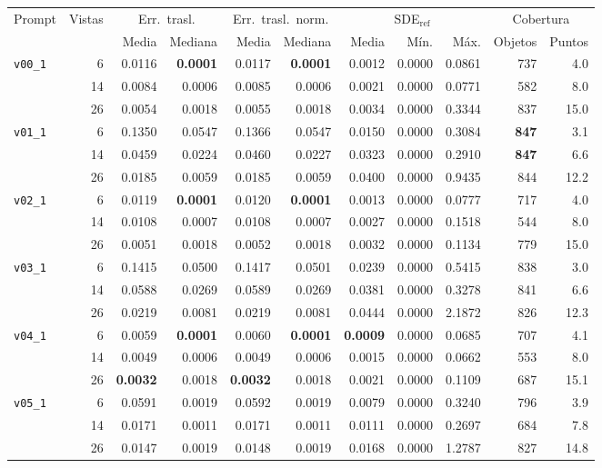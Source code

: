 \begin{table}[H]
\vspace{2ex}

\begin{tabular*}{\textwidth}{@{\extracolsep{\fill}}lrrrrrrrrrr@{}}
\toprule
\multirow{2}{*}{Prompt} & \multirow{2}{*}{Vistas} & \multicolumn{2}{c}{Err.\ trasl.} & \multicolumn{2}{c}{Err.\ trasl.\ norm.} & \multicolumn{3}{c}{SDE$_{\mathrm{ref}}$} & \multicolumn{2}{c}{Cobertura} \\
\cmidrule(lr){3-4} \cmidrule(lr){5-6} \cmidrule(lr){7-9} \cmidrule(lr){10-11}
 &  & Media & Mediana & Media & Mediana & Media & Mín. & Máx. & Objetos & Puntos \\
\midrule
\multirow{3}{*}{\texttt{v00\_1}} & 6 & 0.0116 & \textbf{0.0001} & 0.0117 & \textbf{0.0001} & 0.0012 & 0.0000 & 0.0861 & 737 & 4.0 \\
 & 14 & 0.0084 & 0.0006 & 0.0085 & 0.0006 & 0.0021 & 0.0000 & 0.0771 & 582 & 8.0 \\
 & 26 & 0.0054 & 0.0018 & 0.0055 & 0.0018 & 0.0034 & 0.0000 & 0.3344 & 837 & 15.0 \\
\midrule
\multirow{3}{*}{\texttt{v01\_1}} & 6 & 0.1350 & 0.0547 & 0.1366 & 0.0547 & 0.0150 & 0.0000 & 0.3084 & \textbf{847} & 3.1 \\
 & 14 & 0.0459 & 0.0224 & 0.0460 & 0.0227 & 0.0323 & 0.0000 & 0.2910 & \textbf{847} & 6.6 \\
 & 26 & 0.0185 & 0.0059 & 0.0185 & 0.0059 & 0.0400 & 0.0000 & 0.9435 & 844 & 12.2 \\
\midrule
\multirow{3}{*}{\texttt{v02\_1}} & 6 & 0.0119 & \textbf{0.0001} & 0.0120 & \textbf{0.0001} & 0.0013 & 0.0000 & 0.0777 & 717 & 4.0 \\
 & 14 & 0.0108 & 0.0007 & 0.0108 & 0.0007 & 0.0027 & 0.0000 & 0.1518 & 544 & 8.0 \\
 & 26 & 0.0051 & 0.0018 & 0.0052 & 0.0018 & 0.0032 & 0.0000 & 0.1134 & 779 & 15.0 \\
\midrule
\multirow{3}{*}{\texttt{v03\_1}} & 6 & 0.1415 & 0.0500 & 0.1417 & 0.0501 & 0.0239 & 0.0000 & 0.5415 & 838 & 3.0 \\
 & 14 & 0.0588 & 0.0269 & 0.0589 & 0.0269 & 0.0381 & 0.0000 & 0.3278 & 841 & 6.6 \\
 & 26 & 0.0219 & 0.0081 & 0.0219 & 0.0081 & 0.0444 & 0.0000 & 2.1872 & 826 & 12.3 \\
\midrule
\multirow{3}{*}{\texttt{v04\_1}} & 6 & 0.0059 & \textbf{0.0001} & 0.0060 & \textbf{0.0001} & \textbf{0.0009} & 0.0000 & 0.0685 & 707 & 4.1 \\
 & 14 & 0.0049 & 0.0006 & 0.0049 & 0.0006 & 0.0015 & 0.0000 & 0.0662 & 553 & 8.0 \\
 & 26 & \textbf{0.0032} & 0.0018 & \textbf{0.0032} & 0.0018 & 0.0021 & 0.0000 & 0.1109 & 687 & 15.1 \\
\midrule
\multirow{3}{*}{\texttt{v05\_1}} & 6 & 0.0591 & 0.0019 & 0.0592 & 0.0019 & 0.0079 & 0.0000 & 0.3240 & 796 & 3.9 \\
 & 14 & 0.0171 & 0.0011 & 0.0171 & 0.0011 & 0.0111 & 0.0000 & 0.2697 & 684 & 7.8 \\
 & 26 & 0.0147 & 0.0019 & 0.0148 & 0.0019 & 0.0168 & 0.0000 & 1.2787 & 827 & 14.8 \\
\bottomrule
\end{tabular*}


\end{table}
